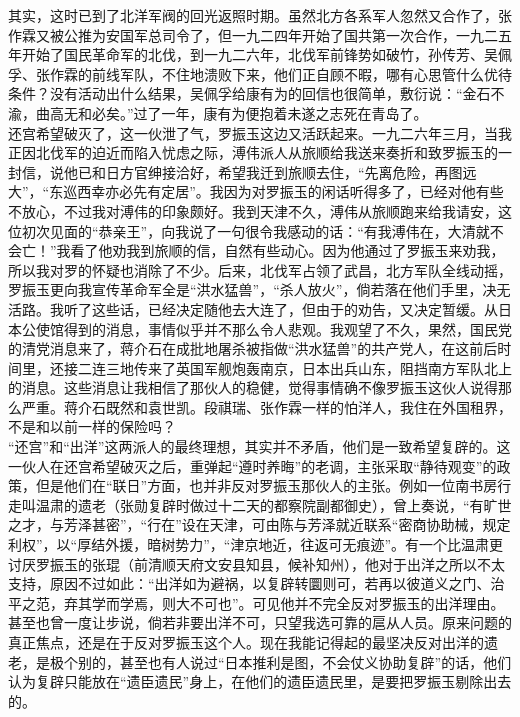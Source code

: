 其实，这时已到了北洋军阀的回光返照时期。虽然北方各系军人忽然又合作了，张作霖又被公推为安国军总司令了，但一九二四年开始了国共第一次合作，一九二五年开始了国民革命军的北伐，到一九二六年，北伐军前锋势如破竹，孙传芳、吴佩孚、张作霖的前线军队，不住地溃败下来，他们正自顾不暇，哪有心思管什么优待条件？没有活动出什么结果，吴佩孚给康有为的回信也很简单，敷衍说：“金石不渝，曲高无和必矣。”过了一年，康有为便抱着未遂之志死在青岛了。\\

还宫希望破灭了，这一伙泄了气，罗振玉这边又活跃起来。一九二六年三月，当我正因北伐军的迫近而陷入忧虑之际，溥伟派人从旅顺给我送来奏折和致罗振玉的一封信，说他已和日方官绅接洽好，希望我迁到旅顺去住，“先离危险，再图远大”，“东巡西幸亦必先有定居”。我因为对罗振玉的闲话听得多了，已经对他有些不放心，不过我对溥伟的印象颇好。我到天津不久，溥伟从旅顺跑来给我请安，这位初次见面的“恭亲王”，向我说了一句很令我感动的话：“有我溥伟在，大清就不会亡！”我看了他劝我到旅顺的信，自然有些动心。因为他通过了罗振玉来劝我，所以我对罗的怀疑也消除了不少。后来，北伐军占领了武昌，北方军队全线动摇，罗振玉更向我宣传革命军全是“洪水猛兽”，“杀人放火”，倘若落在他们手里，决无活路。我听了这些话，已经决定随他去大连了，但由于的劝告，又决定暂缓。从日本公使馆得到的消息，事情似乎并不那么令人悲观。我观望了不久，果然，国民党的清党消息来了，蒋介石在成批地屠杀被指做“洪水猛兽”的共产党人，在这前后时间里，还接二连三地传来了英国军舰炮轰南京，日本出兵山东，阻挡南方军队北上的消息。这些消息让我相信了那伙人的稳健，觉得事情确不像罗振玉这伙人说得那么严重。蒋介石既然和袁世凯。段祺瑞、张作霖一样的怕洋人，我住在外国租界，不是和以前一样的保险吗？\\

“还宫”和“出洋”这两派人的最终理想，其实并不矛盾，他们是一致希望复辟的。这一伙人在还宫希望破灭之后，重弹起“遵时养晦”的老调，主张采取“静待观变”的政策，但是他们在“联日”方面，也并非反对罗振玉那伙人的主张。例如一位南书房行走叫温肃的遗老（张勋复辟时做过十二天的都察院副都御史），曾上奏说，“有旷世之才，与芳泽甚密”，“行在”设在天津，可由陈与芳泽就近联系“密商协助械，规定利权”，以“厚结外援，暗树势力”，“津京地近，往返可无痕迹”。有一个比温肃更讨厌罗振玉的张琨（前清顺天府文安县知县，候补知州），他对于出洋之所以不太支持，原因不过如此：“出洋如为避祸，以复辟转圜则可，若再以彼道义之门、治平之范，弃其学而学焉，则大不可也”。可见他并不完全反对罗振玉的出洋理由。甚至也曾一度让步说，倘若非要出洋不可，只望我选可靠的扈从人员。原来问题的真正焦点，还是在于反对罗振玉这个人。现在我能记得起的最坚决反对出洋的遗老，是极个别的，甚至也有人说过“日本推利是图，不会仗义协助复辟”的话，他们认为复辟只能放在“遗臣遗民”身上，在他们的遗臣遗民里，是要把罗振玉剔除出去的。\\

